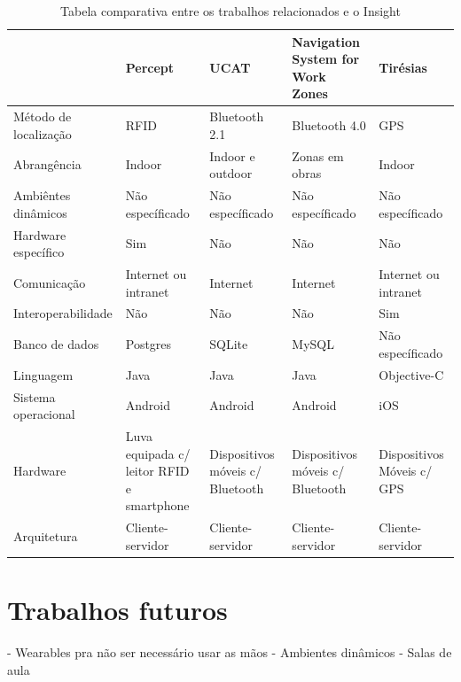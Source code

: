 \documentclass[english,brazilian]{UNISINOSmonografia}
\begin{document}
\FloatBarrier
\begin{table}
	\caption{Tabela comparativa entre os trabalhos relacionados e o Insight}
	\label{tab:trabalalhosRelacionadosEInsight}
	\centering%
	\begin{minipage}{1\textwidth}
		\begin{tabular}{ | p{3cm} | p{3cm} | p{3cm} | p{3cm} | p{3cm} | }
			\hline
										& Percept 									& UCAT 								& Navigation System for Work Zones		& Tirésias   \\ \hline
				Método de localização 	& RFID 										& Bluetooth 2.1 					& Bluetooth 4.0 						& GPS 						 \\ \hline
				Abrangência 			& Indoor 									& Indoor e outdoor 					& Zonas em obras 						& Indoor 					 \\ \hline
				Ambiêntes dinâmicos		& Não específicado							& Não específicado					& Não específicado						& Não específicado			 \\ \hline
				Hardware específico 	& Sim 										& Não 								& Não 									& Não 						 \\ \hline
				Comunicação 			& Internet ou intranet 						& Internet 							& Internet 								& Internet ou intranet 		 \\ \hline
				Interoperabilidade 		& Não 										& Não 								& Não 									& Sim 						 \\ \hline
				Banco de dados 			& Postgres 									& SQLite 							& MySQL 								& Não específicado 			 \\ \hline
				Linguagem 				& Java 										& Java 								& Java 									& Objective-C 				 \\ \hline
				Sistema operacional 	& Android 									& Android 							& Android 								& iOS 						 \\ \hline
				Hardware 				& Luva equipada c/ leitor RFID e smartphone & Dispositivos móveis c/ Bluetooth 	& Dispositivos móveis c/ Bluetooth 		& Dispositivos Móveis c/ GPS \\ \hline
				Arquitetura 			& Cliente-servidor 							& Cliente-servidor 					& Cliente-servidor 						& Cliente-servidor 			 \\ \hline
		\end{tabular}
	\end{minipage}
\end{table}
\FloatBarrier
	
	\section{Trabalhos futuros}
- Wearables pra não ser necessário usar as mãos
- Ambientes dinâmicos
- Salas de aula


\end{document}
